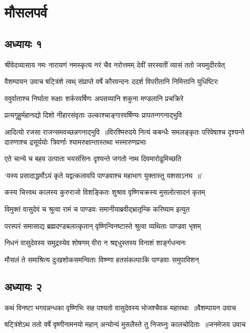 \part{मौसलपर्व}
\chapter{अध्यायः १}
\threelineshloka
{श्रीवेदव्यासाय नमः}
{नारायणं नमस्कृत्य नरं चैव नरोत्तमम्}
{देवीं सरस्वतीं व्यासं ततो जयमुदीरयेत्}


\threelineshloka
{वैशम्पायन उवाच}
{षट्त्रिंशे त्वथ् संप्राप्ते वर्षे कौरवन्दनः}
{ददर्श विपरीतानि निमित्तानि युधिष्टिरः}


\twolineshloka
{ववुर्वाताश्च निर्घाता रूक्षाः शर्करवर्षिणः}
{अपसव्यानि शकुना मण्डलानि प्रचक्रिरे}


\twolineshloka
{प्रत्यगूहुर्महानद्यो दिशो नीहारसंवृताः}
{उल्काश्चाङ्गारवर्षिण्यः प्रापतन्गगनाद्भुवि}


आदित्यो रजसा राजन्समवच्छन्नगनाद्भुवि ॥विरश्मिरुदये नित्यं कबन्धैः समलङ्कृतः
\twolineshloka
{परिवेषाश्च दृश्यन्ते दारुणाश्च द्रसूर्ययोः}
{त्रिवर्णाः श्यामरुक्षान्तास्तथा भस्मारुणप्रभाः}


\twolineshloka
{एते चान्ये च बहव उत्पाता भयसंसिनः}
{दृश्यन्ते जगतो नाथ दिवमारोढुमिच्छति}


\twolineshloka
{`यस्य प्रसादाद्धर्मोऽयं कृते यद्वत्कलावपि}
{पाण्डवाश्च महाभाग युक्तास्तु यशसाऽनघ ॥'}


\twolineshloka
{कस्य चित्त्वथ कालस्य कुरुराजो विशङ्कितः}
{शुश्राव वृष्णिचक्रस्य मुसलोत्सादनं कृतम्}


\twolineshloka
{विमुक्तं वासुदेवं च श्रुत्वा रामं च पाण्डवः}
{समानीयाब्रवीद्भ्रातृन्कि करिष्याम इत्युत}


\twolineshloka
{परस्परं समासाद्य ब्रह्मदण्डबलात्कृतान्}
{वृष्णिन्विनष्टास्ते श्रुत्वा व्यथिताः पाण्डवा भृशम्}


\twolineshloka
{निधनं वासुदेवस्य समुद्रस्येव शोषणम्}
{वीरा न श्रद्दधुस्तस्य विनाशं शार्ङ्गधन्वनः}


\twolineshloka
{मौसलं ते समाश्रित्य दुःखशोकसमन्विताः}
{विष्ण्णा हतसंकल्पाःकि पाण्डवाः समुपाविशन्}


\chapter{अध्यायः २}
\threelineshloka
{कथं विनष्टा भगवन्नन्धका वृष्णिभिः सह}
{पश्यतो वासुदेवस्य भोजश्चैवक महारथाः ॥वैशम्पायन उवाच}
{}


\threelineshloka
{षट्त्रिंशेऽथ ततो वर्षे वृष्णीनामनयो महान्}
{अन्योन्यं मुसलैस्ते तु निजघ्नुः कालचोदिताः ॥जनमेजय उवाच}
{}


